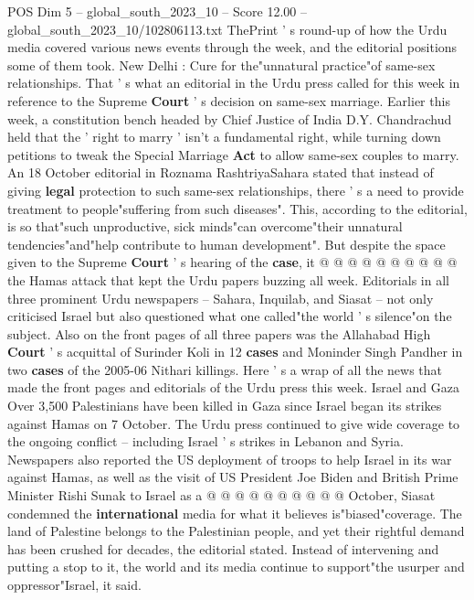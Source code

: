 \begin{textsample}{POS Dim 5 – global\_south\_2023\_10 – Score 12.00 – global\_south\_2023\_10/102806113.txt}  \label{ex:f5_pos_365}
ThePrint ' s round-up of how the Urdu media covered various news events through the week, and the editorial positions some of them took.
New Delhi : Cure for the"unnatural practice"of same-sex relationships.
That ' s what an editorial in the Urdu press called for this week in reference to the Supreme \textbf{Court} ' s decision on same-sex marriage.
Earlier this week, a constitution bench headed by Chief Justice of India D.Y.
Chandrachud held that the ' right to marry ' isn't a fundamental right, while turning down petitions to tweak the Special Marriage \textbf{Act} to allow same-sex couples to marry.
An 18 October editorial in Roznama RashtriyaSahara stated that instead of giving \textbf{legal} protection to such same-sex relationships, there ' s a need to provide treatment to people"suffering from such diseases".
This, according to the editorial, is so that"such unproductive, sick minds"can overcome"their unnatural tendencies"and"help contribute to human development".
But despite the space given to the Supreme \textbf{Court} ' s hearing of the \textbf{case}, it @ @ @ @ @ @ @ @ @ @ the Hamas attack that kept the Urdu papers buzzing all week.
Editorials in all three prominent Urdu newspapers -- Sahara, Inquilab, and Siasat -- not only criticised Israel but also questioned what one called"the world ' s silence"on the subject.
Also on the front pages of all three papers was the Allahabad High \textbf{Court} ' s acquittal of Surinder Koli in 12 \textbf{cases} and Moninder Singh Pandher in two \textbf{cases} of the 2005-06 Nithari killings.
Here ' s a wrap of all the news that made the front pages and editorials of the Urdu press this week.
Israel and Gaza Over 3,500 Palestinians have been killed in Gaza since Israel began its strikes against Hamas on 7 October.
The Urdu press continued to give wide coverage to the ongoing conflict -- including Israel ' s strikes in Lebanon and Syria.
Newspapers also reported the US deployment of troops to help Israel in its war against Hamas, as well as the visit of US President Joe Biden and British Prime Minister Rishi Sunak to Israel as a @ @ @ @ @ @ @ @ @ @ October, Siasat condemned the \textbf{international} media for what it believes is"biased"coverage.
The land of Palestine belongs to the Palestinian people, and yet their rightful demand has been crushed for decades, the editorial stated.
Instead of intervening and putting a stop to it, the world and its media continue to support"the usurper and oppressor"Israel, it said.

\end{textsample}
